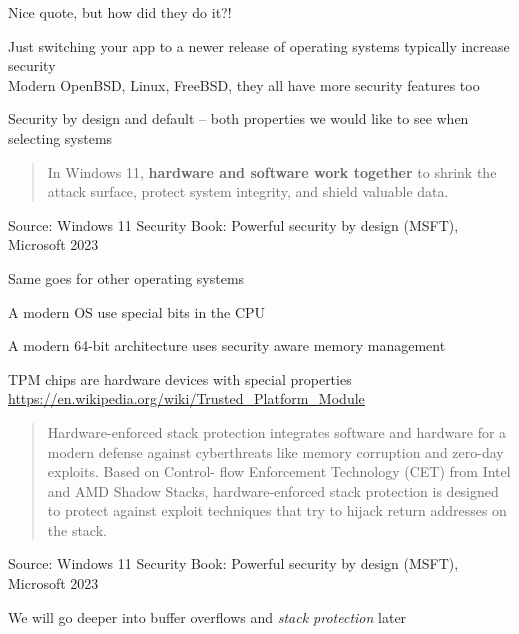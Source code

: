 \documentclass[Screen16to9,17pt]{foils}
\begin{document}
\begin{list2}
\item Nice quote, but how did they do it?!
\item Just switching your app to a newer release of operating systems typically increase security\\
Modern OpenBSD, Linux, FreeBSD, they all have more security features too
\item Security by design and default -- both properties we would like to see when selecting systems
\end{list2}



\begin{quote}
In Windows 11, {\bf hardware and software work together}
to shrink the attack surface, protect system integrity,
and shield valuable data.
\end{quote}
Source: Windows 11 Security Book: Powerful security by design (MSFT), Microsoft 2023

Same goes for other operating systems
\begin{list2}
\item A modern OS use special bits in the CPU
\item A modern 64-bit architecture uses security aware memory management
\item TPM chips are hardware devices with special properties\\
\url{https://en.wikipedia.org/wiki/Trusted_Platform_Module}
\end{list2}



\begin{quote}
Hardware-enforced stack protection integrates software and hardware for a modern defense
against cyberthreats like memory corruption and zero-day exploits. Based on Control- flow
Enforcement Technology (CET) from Intel and AMD Shadow Stacks, hardware-enforced
stack protection is designed to protect against exploit techniques that try to hijack return
addresses on the stack.
\end{quote}
Source: Windows 11 Security Book: Powerful security by design (MSFT), Microsoft 2023

\begin{list2}
\item We will go deeper into buffer overflows and \emph{stack protection} later
\end{list2}
\end{document}
